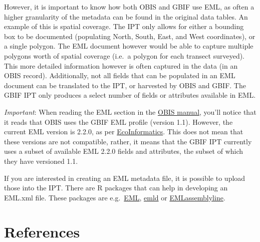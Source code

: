 \documentclass[
]{book}
\begin{document}
However, it is important to know how both OBIS and GBIF use EML, as often a higher granularity of the metadata can be found in the original data tables. An example of this is spatial coverage. The IPT only allows for either a bounding box to be documented (populating North, South, East, and West coordinates), or a single polygon. The EML document however would be able to capture multiple polygons worth of spatial coverage (i.e.~a polygon for each transect surveyed). This more detailed information however is often captured in the data (in an OBIS record). Additionally, not all fields that can be populated in an EML document can be translated to the IPT, or harvested by OBIS and GBIF. The GBIF IPT only produces a select number of fields or attributes available in EML.

\emph{Important}: When reading the EML section in the \href{https://obis.org/manual/eml/}{OBIS manual}, you'll notice that it reads that OBIS uses the GBIF EML profile (version 1.1). However, the current EML version is 2.2.0, as per \href{https://eml.ecoinformatics.org/}{EcoInformatics}. This does not mean that these versions are not compatible, rather, it means that the GBIF IPT currently uses a subset of available EML 2.2.0 fields and attributes, the subset of which they have versioned 1.1.

If you are interested in creating an EML metadata file, it is possible to upload those into the IPT. There are R packages that can help in developing an EML.xml file. These packages are e.g.~\href{https://github.com/ropensci/EML}{EML}, \href{https://github.com/ropensci/emld}{emld} or \href{https://ediorg.github.io/EMLassemblyline/articles/overview.html}{EMLassemblyline}.

\hypertarget{references}{%
\chapter*{References}\label{references}}
\end{document}
